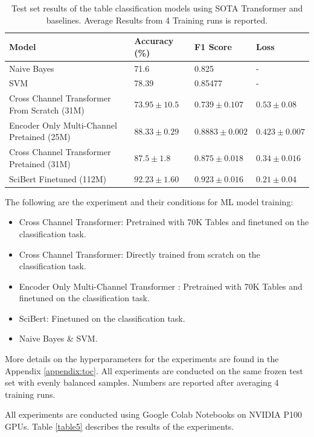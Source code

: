 \begin{table}[h]
    \label{table\arabic{tablecounter}}
    \centering
    \begin{tabular}{|p{4cm}|p{3cm}|p{3cm}|p{3cm}|}
    \hline
        \textbf{Model} & \textbf{Accuracy} (\%) & \textbf{F1 Score}  & \textbf{Loss} \\ \hline
        Naive Bayes & 71.6 & 0.825 & - \\ \hline
        SVM  & 78.39 & 0.85477 & - \\ \hline
        Cross Channel Transformer From Scratch (31M) & $73.95 \pm 10.5 $ & $0.739 \pm 0.107$ & $0.53 \pm 0.08$ \\ \hline
        Encoder Only Multi-Channel Pretained (25M) & $88.33 \pm 0.29$ & $0.8883 \pm 0.002$ & $0.423 \pm 0.007$ \\ \hline
        Cross Channel Transformer Pretained (31M) & $87.5 \pm 1.8$ & $0.875 \pm 0.018$ & $0.34 \pm 0.016$ \\ \hline
        SciBert Finetuned (112M) & $92.23 \pm 1.60$ & $0.923 \pm 0.016$ & $0.21 \pm 0.04$ \\ \hline
    \end{tabular}
    \caption{\label{tablecounter} Test set results of the table classification models using SOTA Transformer and baselines. Average Results from 4 Training runs is reported. }
\end{table}
The following are the experiment and their conditions for ML model training:
\begin{itemize}
    \item Cross Channel Transformer: Pretrained with 70K Tables and finetuned on the classification task.
    \item Cross Channel Transformer: Directly trained from scratch on the classification task.
    \item Encoder Only Multi-Channel Transformer : Pretrained with 70K Tables and finetuned on the classification task.
    \item SciBert: Finetuned on the classification task.
    \item Naive Bayes \& SVM.
\end{itemize}
More details on the hyperparameters for the experiments are found in the Appendix \ref{appendix:toc}. All experiments are conducted on the same frozen test set with evenly balanced samples. Numbers are reported after averaging 4 training runs.

All experiments are conducted using Google Colab Notebooks on NVIDIA P100 GPUs. Table \ref{table5} describes the results of the experiments. 

